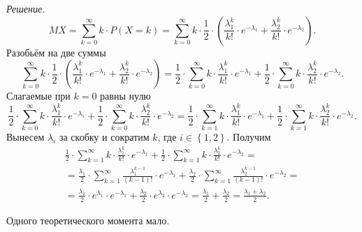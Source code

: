 \textit{Решение.}
$$MX =
  \sum \limits_{k = 0}^{ \infty } k \cdot P \left( X = k \right) =
  \sum \limits_{k = 0}^{ \infty }
    k \cdot \frac{1}{2} \cdot
    \left(
      \frac{ \lambda_1^k}{k!} \cdot e^{- \lambda_1} + \frac{ \lambda_2^k}{k!} \cdot e^{- \lambda_2}
    \right).$$
Разобьём на две суммы
$$ \sum \limits_{k = 0}^{ \infty }
    k \cdot \frac{1}{2} \cdot
    \left(
      \frac{ \lambda_1^k}{k!} \cdot e^{- \lambda_1} + \frac{ \lambda_2^k}{k!} \cdot e^{- \lambda_2}
    \right) =
  \frac{1}{2} \cdot
  \sum \limits_{k = 0}^{ \infty } k \cdot \frac{ \lambda_1^k}{k!} \cdot e^{- \lambda_1} +
  \frac{1}{2} \cdot
  \sum \limits_{k = 0}^{ \infty } k \cdot \frac{ \lambda_2^k}{k!} \cdot e^{- \lambda_2}.$$
Слагаемые при $k = 0$ равны нулю
$$ \frac{1}{2} \cdot
  \sum \limits_{k = 0}^{ \infty } k \cdot \frac{ \lambda_1^k}{k!} \cdot e^{- \lambda_1} +
  \frac{1}{2} \cdot
  \sum \limits_{k = 0}^{ \infty } k \cdot \frac{ \lambda_2^k}{k!} \cdot e^{- \lambda_2} =
  \frac{1}{2} \cdot
  \sum \limits_{k = 1}^{ \infty } k \cdot \frac{ \lambda_1^k}{k!} \cdot e^{- \lambda_1} +
  \frac{1}{2} \cdot
  \sum \limits_{k = 1}^{ \infty } k \cdot \frac{ \lambda_2^k}{k!} \cdot e^{- \lambda_2}.$$
Вынесем $ \lambda_i$ за скобку и сократим $k$, где $i \in \left\{ 1, 2 \right\} $.
Получим
\begin{equation*}
  \begin{split}
    \frac{1}{2} \cdot
    \sum \limits_{k = 1}^{ \infty } k \cdot \frac{ \lambda_1^k}{k!} \cdot e^{- \lambda_1} +
    \frac{1}{2} \cdot
    \sum \limits_{k = 1}^{ \infty } k \cdot \frac{ \lambda_2^k}{k!} \cdot e^{- \lambda_2} = \\
    = \frac{ \lambda_1}{2} \cdot
    \sum \limits_{k = 1}^{ \infty }
      \frac{ \lambda_1^{k - 1}}{ \left( k - 1 \right)!} \cdot e^{- \lambda_1} +
    \frac{ \lambda_2}{2} \cdot
    \sum \limits_{k = 1}^{ \infty }
      \frac{ \lambda_2^{k - 1}}{ \left( k - 1 \right)!} \cdot e^{- \lambda_2} = \\
    = \frac{ \lambda_1}{2} \cdot e^{ \lambda_1} \cdot e^{- \lambda_1} +
    \frac{ \lambda_2}{2} \cdot e^{ \lambda_2} \cdot e^{- \lambda_2} =
    \frac{ \lambda_1}{2} + \frac{ \lambda_2}{2} =
    \frac{ \lambda_1 + \lambda_2}{2}.
  \end{split}
\end{equation*}

Одного теоретического момента мало.

